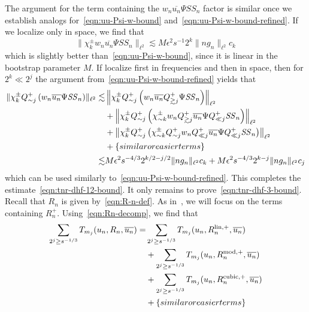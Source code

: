 \documentclass[letterpaper, reqno,final]{amsart}
\newcommand{\mSS}{\mathit{SS}}
\newcommand{\discrAvg}{\Psi}
\newcommand{\btext}[1]{\left\{\textup{#1}\right\}}
\newcommand{\bsime}{\btext{similar or easier terms}}
\begin{document}
The argument for the term containing the $w_n\overline{u_n} \discrAvg \mSS_n$ factor is similar once we establish analogs for~\eqref{eqn:uu-Psi-w-bound} and~\eqref{eqn:uu-Psi-w-bound-refined}.  If we localize only in space, we find that
\begin{equation}\label{eqn:wu-Psi-SS-bound}
    \lVert \chi_{k}^\pm  w_n \overline{u_n} \discrAvg \mSS_n \rVert_{\ell^2} \lesssim M\epsilon^2 s^{-1} 2^k \lVert n g_n \rVert_{\ell^2} c_k
\end{equation}
which is slightly better than~\eqref{eqn:uu-Psi-w-bound}, since it is linear in the bootstrap parameter $M$.  If localize first in frequencies and then in space, then for $2^k \ll 2^j$ the argument from~\eqref{eqn:uu-Psi-w-bound-refined} yields that
\begin{equation}\label{eqn:wu-Psi-SS-bound-refined}\begin{split}
    \lVert \chi_{k}^\pm  Q_{\sim j}^+ \left(w_n \overline{u_n} \discrAvg \mSS_n\right) \rVert_{\ell^2} \lesssim& \left\lVert \chi_{k}^\pm  Q_{\sim j}^+\left(  w_n \overline{u_n} Q_{\gtrsim j}^+ \discrAvg \mSS_n\right)\right\rVert_{\ell^2} \\
    &+ \left\lVert \chi_{k}^\pm  Q_{\sim j}^+\left(\chi_{\sim k}^\pm   w_n Q_{\gtrsim j}^+ \overline{u_n} \discrAvg Q_{\ll j}^+ \mSS_n\right) \right\rVert_{\ell^2}\\
    &+ \left\lVert \chi_{k}^\pm Q_{\sim j}^+\left(\chi_{\sim k}^\pm Q^+_{\sim j} w_n Q_{\ll j}^+ \overline{u_n} \discrAvg Q_{\ll j}^+ \mSS_n\right)\right\rVert_{\ell^2}\\
    &+ \bsime\\
    \lesssim& M\epsilon^2 s^{-4/3} 2^{k/2-j/2} \lVert n g_n \rVert_{\ell^2} c_k + M\epsilon^2 s^{-4/3} 2^{k - j} \lVert n g_n \rVert_{\ell^2} c_j
\end{split}\end{equation}
which can be used similarly to~\eqref{eqn:uu-Psi-w-bound-refined}.  This completes the estimate~\eqref{eqn:tnr-dhf-12-bound}.  It only remains to prove~\eqref{eqn:tnr-dhf-3-bound}.  Recall that $R_n$ is given by~\eqref{eqn:R-n-def}.  As in~, we will focus on the terms containing $R_n^+$.  Using~\eqref{eqn:Rn-decomp}, we find that
\begin{subequations}\begin{align}
    \sum_{2^j \geq s^{-1/3}} T_{m_j}(u_n, R_n, \overline{u_n}) =& \sum_{2^j \geq s^{-1/3}} T_{m_j}(u_n, R_n^{\text{lin},+}, \overline{u_n})\label{eqn:tnr-dhf-3-a}\\
    &+\sum_{2^j \geq s^{-1/3}} T_{m_j}(u_n, R_n^{\text{mod},+}, \overline{u_n})\label{eqn:tnr-dhf-3-b}\\
    &+\sum_{2^j \geq s^{-1/3}} T_{m_j}(u_n, R_n^{\text{cubic},+}, \overline{u_n})\label{eqn:tnr-dhf-3-c}\\
    &+ \bsime\notag
\end{align}\end{subequations}
\end{document}
